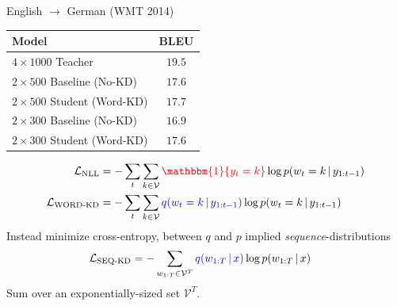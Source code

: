 \documentclass{beamer}
\let\tempone\itemize
\let\temptwo\enditemize
\renewenvironment{itemize}{\tempone\addtolength{\itemsep}{0.5\baselineskip}}{\temptwo}
\newcommand{\air}{\vspace{0.25cm}}
\newcommand{\given}{\,|\,}
\begin{document}
\begin{frame}
\centerline{}
\air
\air
\center English $\rightarrow$ German (WMT 2014)
\begin{table}
\centering
\small
\begin{tabular}{lc}
\toprule
Model &  BLEU   \\
\midrule
$4 \times 1000$  Teacher    &  $19.5$ \\
\midrule
$2 \times 500$ Baseline (No-KD)  $\,$   &  $17.6$   \\
$2 \times 500$ Student (Word-KD)  & $17.7$   \\
\midrule 
$2 \times 300$  Baseline (No-KD)  $\,$   &  $16.9$  \\
$2 \times 300$  Student (Word-KD)  &  $17.6$  \\
\bottomrule
\end{tabular}
\end{table}
\end{frame}


\begin{frame}
\centerline{}
\air 
\begin{align*}
\mathcal{L}_{\text{NLL}} &=- \sum_t \sum_{k \in \mathcal{V}} {\color{red}{\mathbbm{1}\{y_t = k\}}} \log p(w_t = k \given  y_{1:t-1}) \\
\mathcal{L}_{\text{WORD-KD}} &=- \sum_t \sum_{k \in \mathcal{V}} {\color{blue}{q(w_t = k \given y_{1:t-1})}} \log p(w_t = k \given  y_{1:t-1})
\end{align*}
\pause
Instead minimize cross-entropy, between $q$ and $p$ implied \emph{sequence}-distributions 
\begin{align*}
\mathcal{L}_\text{SEQ-KD} &=  -\sum_{w_{1:T} \in \mathcal{V}^T}{\color{blue}{q(w_{1:T} \given x)}}  \log p(w_{1:T} \given x  )
\end{align*}
\air
Sum over an exponentially-sized set $\mathcal{V}^T$. 
\end{frame}
\end{document}
